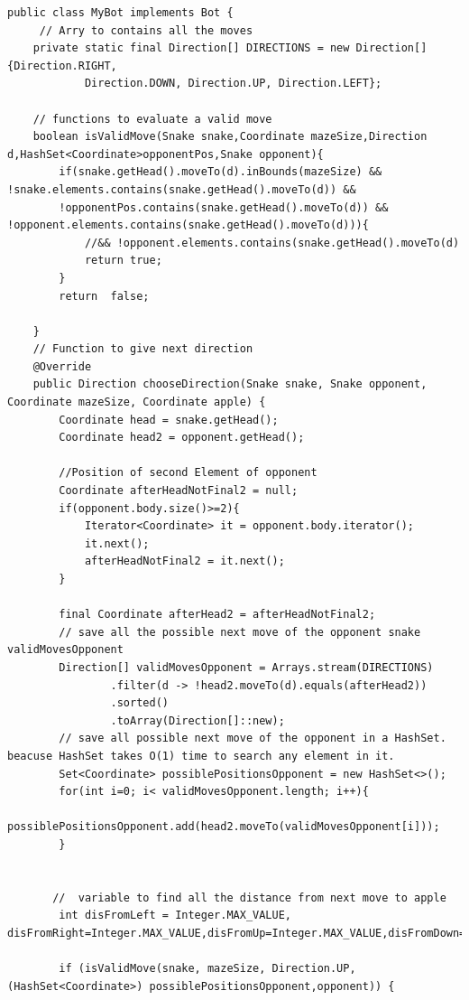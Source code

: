 \documentclass[a4paper,12pt]{article}
\begin{document}
\begin{verbatim}
public class MyBot implements Bot {
     // Arry to contains all the moves
    private static final Direction[] DIRECTIONS = new Direction[]{Direction.RIGHT,
            Direction.DOWN, Direction.UP, Direction.LEFT};
    
    // functions to evaluate a valid move
    boolean isValidMove(Snake snake,Coordinate mazeSize,Direction d,HashSet<Coordinate>opponentPos,Snake opponent){
        if(snake.getHead().moveTo(d).inBounds(mazeSize) && !snake.elements.contains(snake.getHead().moveTo(d)) && 
        !opponentPos.contains(snake.getHead().moveTo(d)) && !opponent.elements.contains(snake.getHead().moveTo(d))){
            //&& !opponent.elements.contains(snake.getHead().moveTo(d)
            return true;
        }
        return  false;

    }
    // Function to give next direction 
    @Override
    public Direction chooseDirection(Snake snake, Snake opponent, Coordinate mazeSize, Coordinate apple) {
        Coordinate head = snake.getHead();
        Coordinate head2 = opponent.getHead();

        //Position of second Element of opponent
        Coordinate afterHeadNotFinal2 = null;
        if(opponent.body.size()>=2){
            Iterator<Coordinate> it = opponent.body.iterator();
            it.next();
            afterHeadNotFinal2 = it.next();
        }

        final Coordinate afterHead2 = afterHeadNotFinal2;
        // save all the possible next move of the opponent snake validMovesOpponent
        Direction[] validMovesOpponent = Arrays.stream(DIRECTIONS)
                .filter(d -> !head2.moveTo(d).equals(afterHead2))
                .sorted()
                .toArray(Direction[]::new);
        // save all possible next move of the opponent in a HashSet. beacuse HashSet takes O(1) time to search any element in it.
        Set<Coordinate> possiblePositionsOpponent = new HashSet<>();
        for(int i=0; i< validMovesOpponent.length; i++){
            possiblePositionsOpponent.add(head2.moveTo(validMovesOpponent[i]));
        }


       //  variable to find all the distance from next move to apple
        int disFromLeft = Integer.MAX_VALUE, disFromRight=Integer.MAX_VALUE,disFromUp=Integer.MAX_VALUE,disFromDown=Integer.MAX_VALUE;

        if (isValidMove(snake, mazeSize, Direction.UP, (HashSet<Coordinate>) possiblePositionsOpponent,opponent)) {


\end{verbatim}
\end{document}
